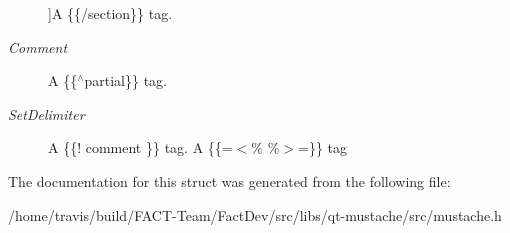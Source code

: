 \begin{Desc}
\begin{description}
{}]A \{\{/section\}\} tag. \item[{\em 
\hypertarget{structMustache_1_1Tag_ab702ed1288811f8bb16d76babfdb6472a85c0e87f362943cf0244792873edd478}{Comment}\label{structMustache_1_1Tag_ab702ed1288811f8bb16d76babfdb6472a85c0e87f362943cf0244792873edd478}
}]A \{\{$^\wedge$partial\}\} tag. \item[{\em 
\hypertarget{structMustache_1_1Tag_ab702ed1288811f8bb16d76babfdb6472a680bf1878bdfa8c7ed5a594603b638be}{Set\-Delimiter}\label{structMustache_1_1Tag_ab702ed1288811f8bb16d76babfdb6472a680bf1878bdfa8c7ed5a594603b638be}
}]A \{\{! comment \}\} tag. A \{\{=$<$\% \%$>$=\}\} tag \end{description}
\end{Desc}


The documentation for this struct was generated from the following file\-:\begin{DoxyCompactItemize}
\item 
/home/travis/build/\-F\-A\-C\-T-\/\-Team/\-Fact\-Dev/src/libs/qt-\/mustache/src/mustache.\-h\end{DoxyCompactItemize}
